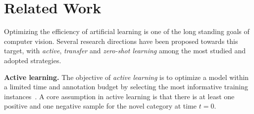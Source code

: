 \documentclass[10pt,twocolumn,letterpaper]{article}
\begin{document}

\section{Related Work}
Optimizing the efficiency of artificial learning is one of the long standing goals of
computer vision. Several research directions have been proposed towards this target, with 
\emph{active}, \emph{transfer} and \emph{zero-shot learning} among the most studied and adopted 
strategies.

\textbf{Active learning.}
The objective of \emph{active learning} is to optimize a model within a limited time and annotation budget by selecting the most informative training instances~\cite{settles2009active}. A core assumption in active learning is that there is at least one positive and one negative sample for the novel category at time $t=0$.
\end{document}
